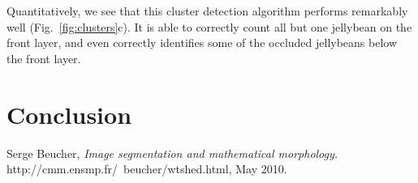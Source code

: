\documentclass[12pt]{article}
\begin{document}
Quantitatively, we see that this cluster detection algorithm performs remarkably well (Fig.~\ref{fig:clusters}c). It is able to correctly count all but one jellybean on the front layer, and even correctly identifies some of the occluded jellybeans below the front layer.



\section{Conclusion}

\begin{thebibliography}{9}

	Serge Beucher,
	\emph{Image segmentation and mathematical morphology.}
	http://cmm.ensmp.fr/~beucher/wtshed.html, May 2010.

\end{thebibliography}
\end{document}
